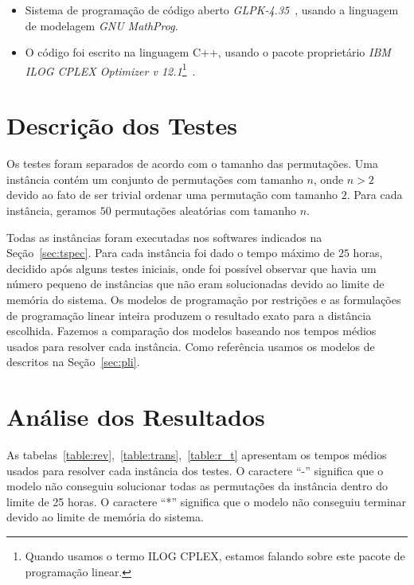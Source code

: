 \begin{itemize}
    \item{Sistema de programação de código
        aberto \textit{GLPK-4.35}~\cite{glpk*2010}, usando a linguagem
        de modelagem \textit{GNU MathProg}.}

    \item{O código foi escrito na linguagem C++, usando o pacote
        proprietário \textit{IBM\textregistered{} ILOG\textregistered{}
        CPLEX\textregistered{} Optimizer v 12.1}\footnote{Quando usamos
        o termo ILOG CPLEX, estamos falando sobre este pacote de
        programação linear.}~\cite{ilogcplex*2011}.}
\end{itemize}

\section{Descrição dos Testes}
\label{sec:testes}
Os testes foram separados de acordo com o tamanho das permutações. Uma
instância contém um conjunto de permutações com tamanho $n$, onde $n >
2$ devido ao fato de ser trivial ordenar uma permutação com tamanho $2$.
Para cada instância, geramos $50$ permutações aleatórias com tamanho
$n$.

Todas as instâncias foram executadas nos softwares indicados na
Seção~\ref{sec:tspec}. Para cada instância foi dado o tempo máximo de
$25$ horas, decidido após alguns testes iniciais, onde foi possível
observar que havia um número pequeno de instâncias que não eram
solucionadas devido ao limite de memória do sistema. Os modelos de
programação por restrições e as formulações de programação linear
inteira produzem o resultado exato para a distância escolhida. Fazemos a
comparação dos modelos baseando nos tempos médios usados para resolver
cada instância. Como referência usamos os modelos de \pli{} descritos na
Seção~\ref{sec:pli}.

\section{Análise dos Resultados}
\label{sec:analise}
As tabelas~\ref{table:rev},~\ref{table:trans},~\ref{table:r_t}
apresentam os tempos médios usados para resolver cada instância dos
testes. O caractere ``-'' significa que o modelo não conseguiu
solucionar todas as permutações da instância dentro do limite de 25
horas. O caractere ``*'' significa que o modelo não conseguiu terminar
devido ao limite de memória do sistema.

